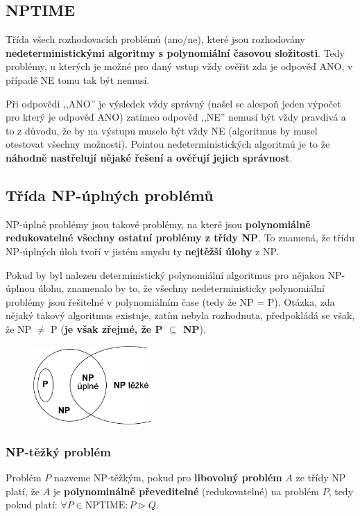 \subsection{NPTIME}
Třída všech rozhodovacích problémů (ano/ne), které jsou rozhodovány \textbf{nedeterministickými algoritmy s polynomiální časovou složitosti}. Tedy problémy, u kterých je možné pro daný vstup vždy ověřit zda je odpověď ANO, v případě NE tomu tak být nemusí.

Při odpovědi ,,ANO'' je výsledek vždy správný (našel se alespoň jeden výpočet pro který je odpověď ANO) zatímco odpověď ,,NE'' nemusí být vždy pravdivá a to z důvodu, že by na výstupu muselo být vždy NE (algoritmus by musel otestovat všechny možnosti).
Pointou nedeterministických algoritmů je to že \textbf{náhodně nastřelují nějaké řešení a ověřují jejich správnost}.

\subsection{Třída NP-úplných problémů}
NP-úplné problémy jsou takové problémy, na které jsou \textbf{polynomiálně redukovatelné všechny ostatní problémy z třídy NP}. To znamená, že třídu NP-úplných úloh tvoří v jistém smyslu ty \textbf{nejtěžší úlohy} z NP. 

Pokud by byl nalezen deterministický polynomiální algoritmus pro nějakou NP-úplnou úlohu, znamenalo by to, že všechny nedeterministicky polynomiální problémy jsou řešitelné v polynomiálním čase (tedy že NP = P). Otázka, zda nějaký takový algoritmus existuje, zatím nebyla rozhodnuta, předpokládá se však, že NP $\neq$ P (\textbf{je však zřejmé, že P $\subseteq$ NP}).

\begin{figure}[H]
	\centering
	\includegraphics[width=0.4\textwidth]{assets/np_problemy}
\end{figure}

\subsubsection{NP-těžký problém}
Problém $P$ nazveme NP-těžkým, pokud pro \textbf{libovolný problém} $A$ ze třídy NP platí, že $A$ je \textbf{polynominálně převeditelné} (redukovatelné) na problém $P$, tedy pokud platí:
$\forall P \in \textrm{NPTIME}: P \triangleright Q$.


